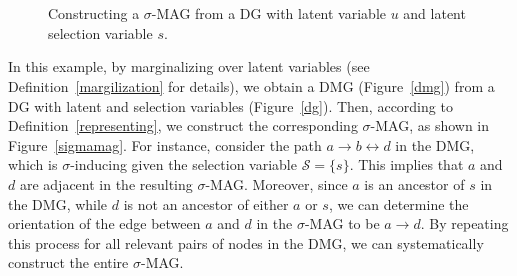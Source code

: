 \documentclass[accepted]{uai2025} %
\newcommand{\tuh}{\mathrel{\rightarrow}}
\newcommand{\huh}{\mathrel{\leftrightarrow}}
\begin{document}
\begin{figure}[t]
    \centering
    \\

    \\

    \caption{Constructing a $\sigma$-MAG from a DG with latent variable $u$ and latent selection variable $s$.}
    \label{construction}
\end{figure}

In this example, by marginalizing over latent variables (see Definition~\ref{margilization} for details), we obtain a DMG (Figure~\ref{dmg}) from a DG with latent and selection variables (Figure~\ref{dg}). Then, according to Definition~\ref{representing}, we construct the corresponding $\sigma$-MAG, as shown in Figure~\ref{sigmamag}. For instance, consider the path $a \tuh b \huh d$ in the DMG, which is $\sigma$-inducing given the selection variable $\mathcal{S} = \{s\}$. This implies that $a$ and $d$ are adjacent in the resulting $\sigma$-MAG. Moreover, since $a$ is an ancestor of $s$ in the DMG, while $d$ is not an ancestor of either $a$ or $s$, we can determine the orientation of the edge between $a$ and $d$ in the $\sigma$-MAG to be $a \tuh d$. By repeating this process for all relevant pairs of nodes in the DMG, we can systematically construct the entire $\sigma$-MAG.
\end{document}
